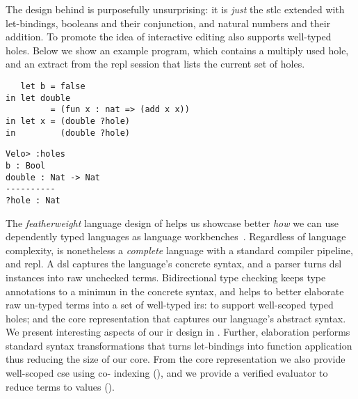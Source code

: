 The design behind \Velo{} is purposefully unsurprising:
%
it is \emph{just} the \ac{stlc} extended with let-bindings, booleans and their conjunction, and natural numbers and their addition.
%
To promote the idea of interactive editing \Velo{} also supports well-typed holes.
%
Below we show an example \Velo{} program, which contains a multiply used hole, and an extract from the \acs*{repl}
session that lists the current set of holes.

\begin{center}
  \begin{minipage}[t]{0.55\linewidth}
\begin{Verbatim}
   let b = false
in let double
         = (fun x : nat => (add x x))
in let x = (double ?hole)
in         (double ?hole)
\end{Verbatim}
\end{minipage}
\hfill
  \begin{minipage}[t]{0.35\linewidth}
    \begin{Verbatim}
Velo> :holes
b : Bool
double : Nat -> Nat
----------
?hole : Nat
\end{Verbatim}
\end{minipage}

\end{center}

The \emph{featherweight} language design of \Velo{} helps us showcase better \emph{how} we can use dependently typed languages as language workbenches~\cite{DBLP:journals/toplas/IgarashiPW01}.
%
Regardless of language complexity, \Velo{} is nonetheless a \emph{complete} language with a standard compiler pipeline, and \acs*{repl}.
%
A \ac{dsl} captures the language's concrete syntax, and a parser turns \ac{dsl} instances into raw unchecked terms.
%
Bidirectional type checking keeps type annotations to a minimun in the concrete syntax, and helps to better elaborate raw un-typed terms into a set of well-typed \acp{ir}:
%
 to support well-scoped typed holes;
%
and
%
 the core representation that captures our language's abstract syntax.
%
We present interesting aspects of our \ac{ir} design in .
%
Further, elaboration performs standard syntax transformations that turns let-bindings into function application thus reducing the size of our core.
%
From the core representation we also provide well-scoped \ac{cse} using co-\DeBruijn{} indexing (), and we provide a verified evaluator to reduce terms to values ().



